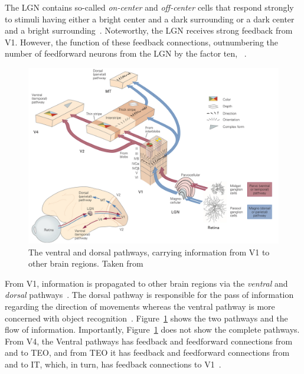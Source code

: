 The \ac{LGN} contains so-called \textit{on-center} and \textit{off-center} cells that respond strongly to stimuli having either a bright center and a dark surrounding or a dark center and a bright surrounding~\citep[pp. 564-566]{mack2013principles}.
Noteworthy, the \ac{LGN} receives strong feedback from \ac{V1}.
However, the function of these feedback connections, outnumbering the number of feedforward neurons from the \ac{LGN} by the factor ten, ~\citep[p. 573]{mack2013principles}.

\begin{figure}
    \centering
    \includegraphics[width=.8\textwidth]{images/ventral_dorsal.jpeg}
    \caption[Ventral and dorsal pathways]{The ventral and dorsal pathways, carrying information from \ac{V1} to other brain regions. Taken from \citet[p. 571]{mack2013principles}}
    \label{fig:ventral_dorsal_pathway}
\end{figure}

From \ac{V1}, information is propagated to other brain regions via the \textit{ventral} and \textit{dorsal} pathways~\citep[pp. 563, 563]{mack2013principles}.
The dorsal pathway is responsible for the pass of information regarding the direction of movements whereas the ventral pathway is more concerned with object recognition~\citep[p. 564]{mack2013principles}.
Figure~\ref{fig:ventral_dorsal_pathway} shows the two pathways and the flow of information.
Importantly, Figure~\ref{fig:ventral_dorsal_pathway} does not show the complete pathways.
From V4, the Ventral pathways has feedback and feedforward connections from and to \ac{TEO}, and from \ac{TEO} it has feedback and feedforward connections from and to \ac{IT}, which, in turn, has feedback connections to \ac{V1}~\citep[p. 563]{mack2013principles}.

